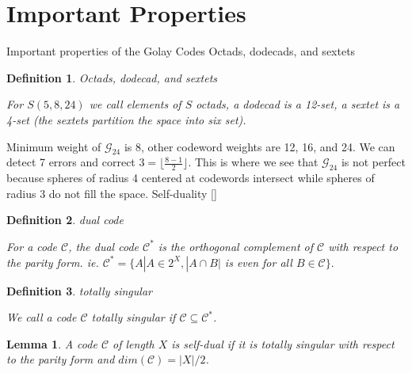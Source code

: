 \documentclass[paper=a4, fontsize=11pt]{scrartcl} %
\numberwithin{equation}{section} %
\numberwithin{figure}{section} %
\numberwithin{table}{section} %
\newtheorem{defn}{Definition}
\newtheorem{lma}{Lemma}
\begin{document}
\section{Important Properties}
\begin{outline}[enumerate]
  \1 Important properties of the Golay Codes
       \2 Octads, dodecads, and sextets
         \begin{defn}{Octads, dodecad, and sextets}

           For $S(5,8,24)$ we call elements of $S$ octads, a dodecad is a 12-set, a sextet is a 4-set (the sextets partition the space into six set).
         \end{defn}
      \2 Minimum weight of $\mathcal{G}_{24}$ is 8, other codeword weights are 12, 16, and 24. We can detect 7 errors and correct $3 = \lfloor \frac{8-1}{2} \rfloor$. This is where we see that $\mathcal{G}_{24}$ is not perfect because spheres of radius 4 centered at codewords intersect while spheres of radius 3 do not fill the space. 
      \2 Self-duality [\cite{ivanov}]
         \begin{defn}{dual code}

          For a code $\mathcal{C}$, the dual code $\mathcal{C}^*$ is the orthogonal complement of $\mathcal{C}$ with respect to the parity form. ie. $\mathcal{C}^{*} = \{A | A \in 2^X, |A \cap B|$ is even for all $B \in \mathcal{C} \}.$
         \end{defn}
         \begin{defn}{totally singular}

          We call a code $\mathcal{C}$ totally singular if $\mathcal{C} \subseteq \mathcal{C}^*$.
         \end{defn}
         \begin{lma}
          A code $\mathcal{C}$ of length $X$ is self-dual if it is totally singular with respect to the parity form and $dim(\mathcal{C}) = |X|/2$.
         \end{lma}
\end{outline}
\end{document}
